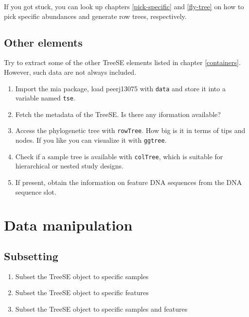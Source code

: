 \documentclass[
]{book}
\providecommand{\tightlist}{%
  \setlength{\itemsep}{0pt}\setlength{\parskip}{0pt}}
\begin{document}
If you got stuck, you can look up chapters \ref{pick-specific} and \ref{fly-tree}
on how to pick specific abundances and generate row trees, respectively.

\hypertarget{other-elements}{%
\subsection{Other elements}\label{other-elements}}

Try to extract some of the other TreeSE elements listed in chapter \ref{containers}.
However, such data are not always included.

\begin{enumerate}
\def\labelenumi{\arabic{enumi}.}
\tightlist
\item
  Import the mia package, load peerj13075 with \texttt{data} and store it into a
  variable named \texttt{tse}.
\item
  Fetch the metadata of the TreeSE. Is there any iformation available?
\item
  Access the phylogenetic tree with \texttt{rowTree}. How big is it in terms of tips
  and nodes. If you like you can visualize it with \texttt{ggtree}.
\item
  Check if a sample tree is available with \texttt{colTree}, which is suitable for
  hierarchical or nested study designs.
\item
  If present, obtain the information on feature DNA sequences from the DNA
  sequence slot.
\end{enumerate}

\hypertarget{data-manipulation}{%
\section{Data manipulation}\label{data-manipulation}}

\hypertarget{subsetting-1}{%
\subsection{Subsetting}\label{subsetting-1}}

\begin{enumerate}
\def\labelenumi{\arabic{enumi}.}
\tightlist
\item
  Subset the TreeSE object to specific samples
\item
  Subset the TreeSE object to specific features
\item
  Subset the TreeSE object to specific samples and features
\end{enumerate}
\end{document}
